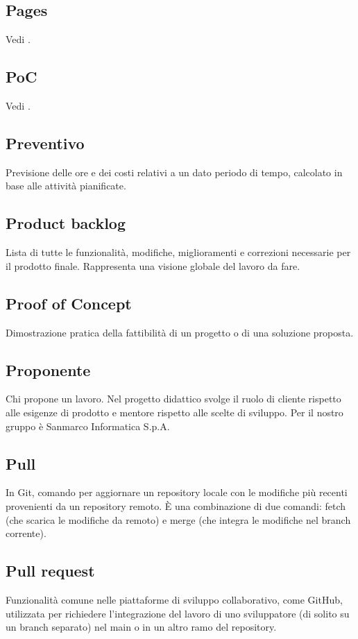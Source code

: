     \subsection{Pages}
    Vedi .
    \subsection{PoC}
    Vedi .
    \subsection{Preventivo}
    Previsione delle ore e dei costi relativi a un dato periodo di tempo,
    calcolato in base alle attività pianificate.
    \subsection{Product backlog}
    \label{Product backlog}
    Lista di tutte le funzionalità, modifiche, miglioramenti e correzioni necessarie 
    per il prodotto finale. Rappresenta una visione globale del lavoro da fare.
    \subsection{Proof of Concept}
    \label{Proof of Concept}
    Dimostrazione pratica della fattibilità di un progetto o di una soluzione proposta.
    \subsection{Proponente}
    Chi propone un lavoro. Nel progetto didattico svolge il ruolo di cliente 
    rispetto alle esigenze di prodotto e mentore rispetto alle scelte di sviluppo.
    Per il nostro gruppo è Sanmarco Informatica S.p.A.
    \subsection{Pull}
    In Git, comando per aggiornare un repository locale con le modifiche più recenti provenienti 
    da un repository remoto. È una combinazione di due comandi: fetch (che scarica le modifiche 
    da remoto) e merge (che integra le modifiche nel branch corrente).
    \subsection{Pull request}
    Funzionalità comune nelle piattaforme di sviluppo collaborativo, come GitHub, utilizzata per 
    richiedere l'integrazione del lavoro di uno sviluppatore (di solito su un branch separato) 
    nel main o in un altro ramo del repository.
